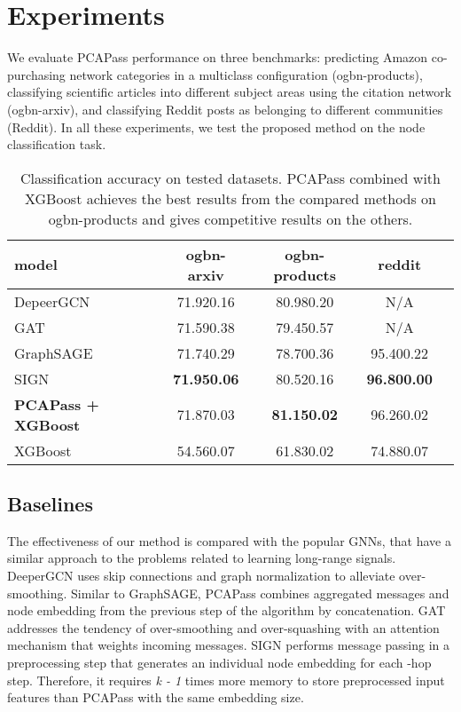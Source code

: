 \documentclass[nohyperref]{article}
\theoremstyle{plain}
\theoremstyle{definition}
\theoremstyle{remark}
\begin{document}
\section{Experiments}
We evaluate PCAPass performance on three benchmarks: predicting Amazon co-purchasing network categories in a multiclass configuration (ogbn-products), classifying scientific articles into different subject areas using the citation network (ogbn-arxiv), and classifying Reddit posts as belonging to different communities (Reddit). In all these experiments, we test the proposed method on the node classification task.
\begin{table}[H]
    \centering
    \caption{Classification accuracy on tested datasets. 
    PCAPass combined with XGBoost achieves the best results from the compared methods on ogbn-products and gives competitive results on the others.}
    \label{accuracy-table}
\vskip 0.15in
    \begin{center}
    \begin{small}
    \begin{sc}
    \fontsize{6.5}{7}\selectfont
    \begin{tabular}{p{2.4cm} cccc}
    \toprule
    \textbf{model} & \textbf{ogbn-arxiv} & \textbf{ogbn-products} & \textbf{reddit} \\
    \midrule
    DepeerGCN&71.920.16&80.980.20&N/A\\
    GAT&71.590.38&79.450.57&N/A\\
    GraphSAGE&71.740.29&78.700.36&95.400.22\\
    SIGN&\textbf{71.950.06}&80.520.16&\textbf{96.800.00}\\
    \textbf{PCAPass + XGBoost}&71.870.03&\textbf{81.150.02}&96.260.02\\
    XGBoost&54.560.07&61.830.02&74.880.07\\
    \bottomrule
    \end{tabular}
    \end{sc}
    \end{small}
    \end{center}
    \vskip -0.1in
    \end{table}

\subsection{Baselines}
The effectiveness of our method is compared with the popular GNNs, that have a similar approach to the problems related to learning long-range signals.
DeeperGCN uses skip connections and graph normalization to alleviate over-smoothing. 
Similar to GraphSAGE, PCAPass combines aggregated messages and node embedding from the previous step of the algorithm by concatenation. 
GAT addresses the tendency of over-smoothing \cite{min2022scattering} and over-squashing \cite{alon2021bottleneck} with an attention mechanism that weights incoming messages. 
SIGN performs message passing in a preprocessing step that generates an individual node embedding for each -hop step. 
Therefore, it requires \textit{k - 1} times more memory to store preprocessed input features than PCAPass with the same embedding size.
\end{document}
